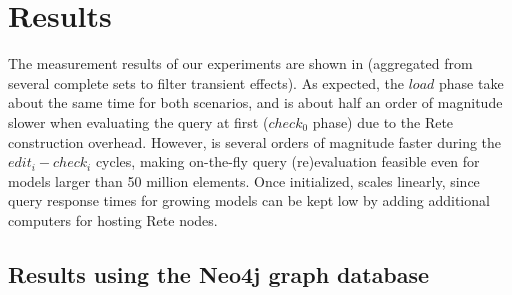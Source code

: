 \section{Results}
\label{benchmark_results}\label{analysis}

The measurement results of our experiments are shown in  (aggregated from several complete sets to filter transient effects). As expected, the $\mathit{load}$ phase take about the same time for both scenarios, and \iqd{} is about half an order of magnitude slower when evaluating the query at first ($\mathit{check}_0$ phase) due to the Rete construction overhead. However, \iqd{} is several orders of magnitude faster during the $\mathit{edit}_i-\mathit{check}_i$ cycles, making on-the-fly query (re)evaluation feasible even for models larger than 50 million elements. Once initialized, \iqd{} scales linearly, since query response times for growing models can be kept low by adding additional computers for hosting Rete nodes.























\subsection{Results using the Neo4j graph database}


\figref{}


\figref{}

